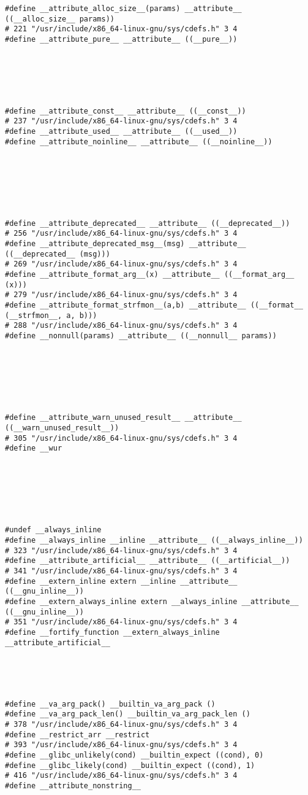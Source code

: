 \documentclass[11pt]{article}
\begin{document}
\begin{verbatim}
#define __attribute_alloc_size__(params) __attribute__ ((__alloc_size__ params))
# 221 "/usr/include/x86_64-linux-gnu/sys/cdefs.h" 3 4
#define __attribute_pure__ __attribute__ ((__pure__))






#define __attribute_const__ __attribute__ ((__const__))
# 237 "/usr/include/x86_64-linux-gnu/sys/cdefs.h" 3 4
#define __attribute_used__ __attribute__ ((__used__))
#define __attribute_noinline__ __attribute__ ((__noinline__))







#define __attribute_deprecated__ __attribute__ ((__deprecated__))
# 256 "/usr/include/x86_64-linux-gnu/sys/cdefs.h" 3 4
#define __attribute_deprecated_msg__(msg) __attribute__ ((__deprecated__ (msg)))
# 269 "/usr/include/x86_64-linux-gnu/sys/cdefs.h" 3 4
#define __attribute_format_arg__(x) __attribute__ ((__format_arg__ (x)))
# 279 "/usr/include/x86_64-linux-gnu/sys/cdefs.h" 3 4
#define __attribute_format_strfmon__(a,b) __attribute__ ((__format__ (__strfmon__, a, b)))
# 288 "/usr/include/x86_64-linux-gnu/sys/cdefs.h" 3 4
#define __nonnull(params) __attribute__ ((__nonnull__ params))







#define __attribute_warn_unused_result__ __attribute__ ((__warn_unused_result__))
# 305 "/usr/include/x86_64-linux-gnu/sys/cdefs.h" 3 4
#define __wur 







#undef __always_inline
#define __always_inline __inline __attribute__ ((__always_inline__))
# 323 "/usr/include/x86_64-linux-gnu/sys/cdefs.h" 3 4
#define __attribute_artificial__ __attribute__ ((__artificial__))
# 341 "/usr/include/x86_64-linux-gnu/sys/cdefs.h" 3 4
#define __extern_inline extern __inline __attribute__ ((__gnu_inline__))
#define __extern_always_inline extern __always_inline __attribute__ ((__gnu_inline__))
# 351 "/usr/include/x86_64-linux-gnu/sys/cdefs.h" 3 4
#define __fortify_function __extern_always_inline __attribute_artificial__





#define __va_arg_pack() __builtin_va_arg_pack ()
#define __va_arg_pack_len() __builtin_va_arg_pack_len ()
# 378 "/usr/include/x86_64-linux-gnu/sys/cdefs.h" 3 4
#define __restrict_arr __restrict
# 393 "/usr/include/x86_64-linux-gnu/sys/cdefs.h" 3 4
#define __glibc_unlikely(cond) __builtin_expect ((cond), 0)
#define __glibc_likely(cond) __builtin_expect ((cond), 1)
# 416 "/usr/include/x86_64-linux-gnu/sys/cdefs.h" 3 4
#define __attribute_nonstring__ 






\end{verbatim}
\end{document}
